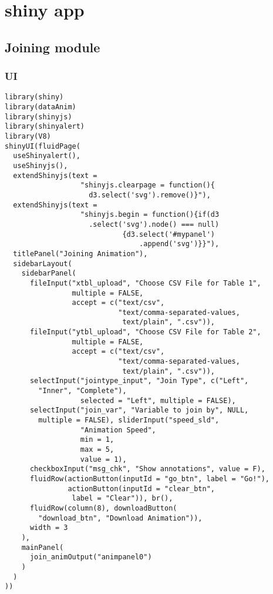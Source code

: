 \chapter{\textbf{shiny} app} \label{AppendixB}

\section{Joining module}
\subsection{UI}
\begin{lstlisting}
library(shiny)
library(dataAnim)
library(shinyjs)
library(shinyalert)
library(V8)
shinyUI(fluidPage(
  useShinyalert(),
  useShinyjs(),
  extendShinyjs(text =
                  "shinyjs.clearpage = function(){
                    d3.select('svg').remove()}"),
  extendShinyjs(text =
                  "shinyjs.begin = function(){if(d3
                    .select('svg').node() === null)
                            {d3.select('#mypanel')
                                .append('svg')}}"),
  titlePanel("Joining Animation"),
  sidebarLayout(
    sidebarPanel(
      fileInput("xtbl_upload", "Choose CSV File for Table 1",
                multiple = FALSE,
                accept = c("text/csv",
                           "text/comma-separated-values,
                            text/plain", ".csv")),
      fileInput("ytbl_upload", "Choose CSV File for Table 2",
                multiple = FALSE,
                accept = c("text/csv",
                           "text/comma-separated-values,
                            text/plain", ".csv")),
      selectInput("jointype_input", "Join Type", c("Left", 
        "Inner", "Complete"),
                  selected = "Left", multiple = FALSE),
      selectInput("join_var", "Variable to join by", NULL, 
        multiple = FALSE), sliderInput("speed_sld",
                  "Animation Speed",
                  min = 1,
                  max = 5,
                  value = 1),
      checkboxInput("msg_chk", "Show annotations", value = F),
      fluidRow(actionButton(inputId = "go_btn", label = "Go!"),
               actionButton(inputId = "clear_btn", 
                label = "Clear")), br(),
      fluidRow(column(8), downloadButton(
        "download_btn", "Download Animation")),
      width = 3
    ),
    mainPanel(
      join_animOutput("animpanel0")
    )
  )
))
\end{lstlisting}

